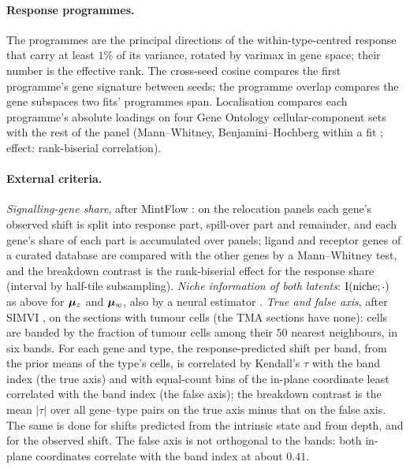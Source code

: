 \paragraph{Response programmes.} The programmes are the principal directions of the within-type-centred response that carry at least $1\%$ of its variance, rotated by varimax \citep{kaiser1958} in gene space; their number is the effective rank. The cross-seed cosine compares the first programme's gene signature between seeds; the programme overlap compares the gene subspaces two fits' programmes span. Localisation compares each programme's absolute loadings on four Gene Ontology cellular-component sets \citep{ashburner2000,go2023} with the rest of the panel (Mann--Whitney, Benjamini--Hochberg within a fit \citep{benjamini1995}; effect: rank-biserial correlation).

\paragraph{External criteria.} \emph{Signalling-gene share}, after MintFlow \citep{akbarnejad2025mintflow}: on the relocation panels each gene's observed shift is split into response part, spill-over part and remainder, and each gene's share of each part is accumulated over panels; ligand and receptor genes of a curated database \citep{jin2025cellchat} are compared with the other genes by a Mann--Whitney test, and the breakdown contrast is the rank-biserial effect for the response share (interval by half-tile subsampling). \emph{Niche information of both latents}: $\operatorname{I}(\text{niche}; \cdot)$ as above for $\boldsymbol{\mu}_z$ and $\boldsymbol{\mu}_w$, also by a neural estimator \citep{belghazi2018}. \emph{True and false axis}, after SIMVI \citep{dong2025simvi}, on the sections with tumour cells (the TMA sections have none): cells are banded by the fraction of tumour cells among their $50$ nearest neighbours, in six bands. For each gene and type, the response-predicted shift per band, from the prior means of the type's cells, is correlated by Kendall's $\tau$ with the band index (the true axis) and with equal-count bins of the in-plane coordinate least correlated with the band index (the false axis); the breakdown contrast is the mean $|\tau|$ over all gene--type pairs on the true axis minus that on the false axis. The same is done for shifts predicted from the intrinsic state and from depth, and for the observed shift. The false axis is not orthogonal to the bands: both in-plane coordinates correlate with the band index at about $0.41$.

